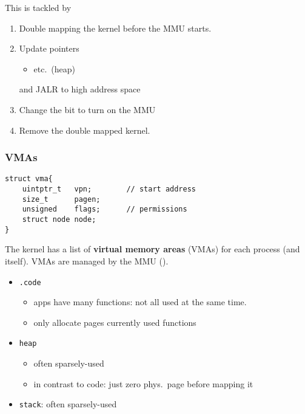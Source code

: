 This is tackled by
\begin{enumerate}
    \item Double mapping the kernel before the MMU starts.
    \item Update pointers
          \begin{itemize}
              \item {} etc.\ (heap)
          \end{itemize}
          and JALR to high address space
    \item Change the  bit to turn on the MMU
    \item Remove the double mapped kernel.
\end{enumerate}

\subsubsection{VMAs}
\begin{lstlisting}[style=bright_C++]
struct vma{
    uintptr_t   vpn;        // start address
    size_t      pagen;
    unsigned    flags;      // permissions
    struct node node;
}
\end{lstlisting}

The kernel has a list of \textbf{virtual memory areas} (VMAs) for each process (and itself). VMAs are managed by the MMU ().


\newpar{}
\begin{itemize}
    \item \texttt{.code}
          \begin{itemize}
              \item apps have many functions: not all used at the same time.
              \item only allocate pages currently used functions
          \end{itemize}
    \item \texttt{heap}
          \begin{itemize}
              \item often sparsely-used
              \item in contrast to code: just zero phys.\ page before mapping it
          \end{itemize}
    \item \texttt{stack}: often sparsely-used
\end{itemize}

